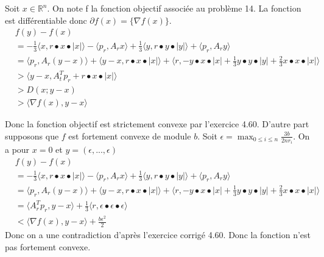 \documentclass[11pt]{article}
\newcommand{\R}{\mathbb{R}^n}
\begin{document}
Soit $x\in\R$. On note f la fonction objectif associée au problème 14. La fonction est différentiable donc $\partial f(x) = \{\nabla f(x)\}$.
\begin{align*}
&f(y) - f(x) \\
&= -\frac{1}{3} \langle x,r \bullet x \bullet |x|\rangle  - \langle p_r,A_rx\rangle  + \frac{1}{3}\langle y,r \bullet y \bullet |y|\rangle  + \langle p_r,A_ry\rangle   \\
&= \langle p_r,A_r(y - x)\rangle  + \langle y-x, r \bullet x \bullet |x|\rangle  + \langle r, -y \bullet x \bullet |x| + \frac{1}{3}y \bullet y \bullet |y| + \frac{2}{3}x \bullet x \bullet |x|\rangle \\
&>  \langle y-x,A_t^Tp_r + r \bullet x \bullet |x|\rangle  \tag{les termes que l'on a enlevé étaient positifs par le lemme ci-dessus} \\
&>  D(x;y-x)\\
&\boxed{>  \langle \nabla f(x),y-x\rangle}
\end{align*}

Donc la fonction objectif est strictement convexe par l'exercice 4.60.
D'autre part supposons que $f$ est fortement convexe de module $b$. Soit $\epsilon =  \max_{0\leq i \leq n} \frac{3b}{2nr_i}$. On a pour $x = 0$ et $y = (\epsilon,...,\epsilon)$
\begin{align*}
&f(y) - f(x) \\
&= -\frac{1}{3} \langle x,r \bullet x \bullet |x|\rangle  - \langle p_r,A_rx\rangle  + \frac{1}{3}\langle y,r \bullet y \bullet |y|\rangle  + \langle p_r,A_ry\rangle   \\
&= \langle p_r,A_r(y - x)\rangle  + \langle y-x, r \bullet x \bullet |x|\rangle  + \langle r, -y \bullet x \bullet |x| + \frac{1}{3}y \bullet y \bullet |y| + \frac{2}{3}x \bullet x \bullet |x|\rangle \\
&= \langle A_r^Tp_r,y-x\rangle   + \frac{1}{3}\langle r, \epsilon \bullet \epsilon \bullet \epsilon\rangle  \\
& \boxed{ <  \langle \nabla f(x),y-x\rangle  + \frac{b \epsilon^2}{2} }
\end{align*}
Donc on a une contradiction d'après l'exercice corrigé 4.60. Donc la fonction n'est pas fortement convexe.
\end{document}
